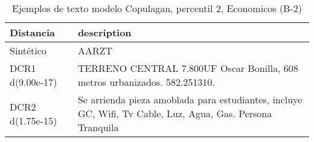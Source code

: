 \begin{table}[H]
\centering
\fontsize{10}{14}\selectfont
\caption{Ejemplos de texto modelo Copulagan, percentil 2, Economicos (B-2)}
\label{table-example-economicos-b-2-copulagan-2p-text}
\begin{tabular}{|l|m{35em}|}
\hline
\rowcolor[gray]{0.8}
Distancia & description \\
\hline Sintético & AARZT \\
\hline DCR1 d(9.00e-17) & TERRENO CENTRAL 7.800UF Oscar Bonilla, 608 metros urbanizados. 582.251310. \\
\hline DCR2 d(1.75e-15) & Se arrienda pieza amoblada para estudiantes, incluye GC, Wifi, Tv Cable, Luz, Agua, Gas. Persona Tranquila   \\
\hline
\end{tabular}
\end{table}
